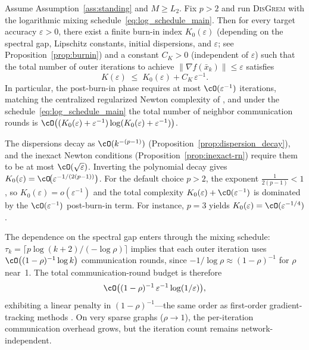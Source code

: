 \documentclass[review,onefignum,onetabnum]{siamart171218}
\begin{document}
\begin{theorem}\label{thm:main}
Assume Assumption~\ref{ass:standing} and $M\ge L_2$.
Fix $p>2$ and run \textsc{DisGrem} with the logarithmic mixing schedule~\eqref{eq:log_schedule_main}.
Then for every target accuracy $\varepsilon>0$, there exist a finite burn-in index $K_0(\varepsilon)$
(depending on the spectral gap, Lipschitz constants, initial dispersions, and $\varepsilon$;
see Proposition~\ref{prop:burnin})
and a constant $C_K>0$ (independent of $\varepsilon$) such that the total number of
outer iterations to achieve $\|\nabla f(\bar x_k)\|\le \varepsilon$ satisfies
\[
K(\varepsilon)\;\le\; K_0(\varepsilon) + C_K\,\varepsilon^{-1}.
\]
In particular,
the post-burn-in phase requires at most $\cO(\varepsilon^{-1})$ iterations,
matching the centralized regularized Newton complexity of \citet{mishchenko2023rn},
and under the schedule~\eqref{eq:log_schedule_main} the total number of neighbor communication rounds is
$\cO\big((K_0(\varepsilon)+\varepsilon^{-1})\log(K_0(\varepsilon)+\varepsilon^{-1})\big)$.
\end{theorem}

\begin{remark}\label{rem:burnin_order}
The dispersions decay as $\cO(k^{-(p-1)})$
(Proposition~\ref{prop:dispersion_decay}), and the inexact Newton
conditions (Proposition~\ref{prop:inexact-rn}) require them to be at
most $\cO(\sqrt\varepsilon)$.
Inverting the polynomial decay gives
$K_0(\varepsilon)=\cO\!\bigl(\varepsilon^{-1/(2(p-1))}\bigr)$.
For the default choice $p>2$, the exponent $\frac{1}{2(p-1)}<1$, so
$K_0(\varepsilon)=o(\varepsilon^{-1})$ and the total complexity
$K_0(\varepsilon)+\cO(\varepsilon^{-1})$ is dominated by the
$\cO(\varepsilon^{-1})$ post-burn-in term.
For instance, $p=3$ yields
$K_0(\varepsilon)=\cO(\varepsilon^{-1/4})$.

The dependence on the spectral gap enters through the mixing schedule:
$\tau_k=\lceil p\log(k+2)/(-\log\rho)\rceil$ implies that each
outer iteration uses $\cO\bigl((1-\rho)^{-1}\log k\bigr)$
communication rounds, since $-1/\log\rho\approx(1-\rho)^{-1}$ for
$\rho$ near~1.
The total communication-round budget is therefore
\[
\cO\bigl((1-\rho)^{-1}\,\varepsilon^{-1}\log(1/\varepsilon)\bigr),
\]
exhibiting a linear penalty in $(1-\rho)^{-1}$---the same
order as first-order gradient-tracking methods
\citep{nedic2017diging}.
On very sparse graphs ($\rho\to 1$), the per-iteration communication
overhead grows, but the iteration count remains network-independent.
\end{remark}
\end{document}
